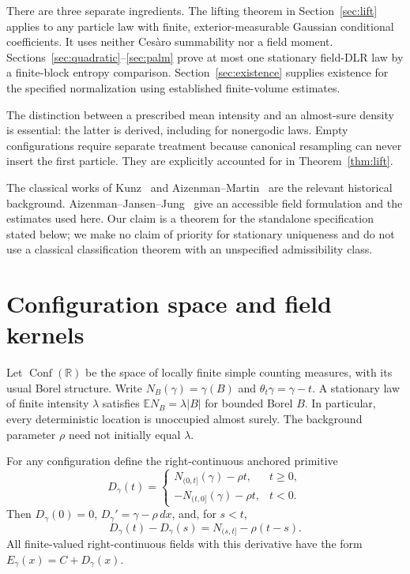 \documentclass[11pt,reqno]{amsart}
\theoremstyle{definition}
\theoremstyle{remark}
\newcommand{\R}{\mathbb R}
\newcommand{\E}{\mathbb E}
\newcommand{\1}{\mathbf 1}
\newcommand{\dd}{\,d}
\newcommand{\Conf}{\operatorname{Conf}}
\numberwithin{equation}{section}
\begin{document}
There are three separate ingredients. The lifting theorem in
Section~\ref{sec:lift} applies to any particle law with finite,
exterior-measurable Gaussian conditional coefficients. It uses neither
Ces\`aro summability nor a field moment. Sections~\ref{sec:quadratic}--\ref{sec:palm}
prove at most one stationary field-DLR law by a finite-block entropy
comparison. Section~\ref{sec:existence} supplies existence for the
specified normalization using established finite-volume estimates.

The distinction between a prescribed mean intensity and an almost-sure
density is essential: the latter is derived, including for nonergodic
laws. Empty configurations require separate treatment because canonical
resampling can never insert the first particle. They are explicitly
accounted for in Theorem~\ref{thm:lift}.

The classical works of Kunz~\cite{Kunz} and Aizenman--Martin~\cite{AM}
are the relevant historical background. Aizenman--Jansen--Jung~\cite{AJJ}
give an accessible field formulation and the estimates used here.
Our claim is a theorem for the standalone specification stated below;
we make no claim of priority for stationary uniqueness and do not use
a classical classification theorem with an unspecified admissibility class.

\section{Configuration space and field kernels}\label{sec:setup}

Let $\Conf(\R)$ be the space of locally finite simple counting measures,
with its usual Borel structure. Write $N_B(\gamma)=\gamma(B)$ and
$\theta_t\gamma=\gamma-t$. A stationary law of finite intensity
$\lambda$ satisfies $\E N_B=\lambda|B|$ for bounded Borel $B$.
In particular, every deterministic location is unoccupied almost surely.
The background parameter $\rho$ need not initially equal $\lambda$.

For any configuration define the right-continuous anchored primitive
\begin{equation}\label{eq:primitive}
D_\gamma(t)=
\begin{cases}
N_{(0,t]}(\gamma)-\rho t,&t\ge0,\\
-N_{(t,0]}(\gamma)-\rho t,&t<0.
\end{cases}
\end{equation}
Then $D_\gamma(0)=0$, $D_\gamma'=\gamma-\rho\dd x$, and, for $s<t$,
\begin{equation}\label{eq:cocycle}
D_\gamma(t)-D_\gamma(s)=N_{(s,t]}-\rho(t-s).
\end{equation}
All finite-valued right-continuous fields with this derivative have the
form $E_\gamma(x)=C+D_\gamma(x)$.
\end{document}
